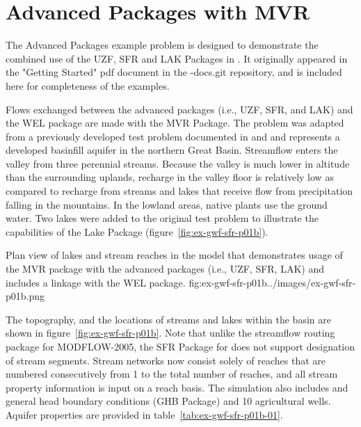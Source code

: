 \section{Advanced Packages with MVR}

The Advanced \mf Packages example problem is designed to demonstrate the combined use of the UZF, SFR and LAK Packages in \mf.  It originally appeared in the "Getting Started" pdf document in the \mf -docs.git repository, and is included here for completeness of the examples. 

Flows exchanged between the advanced packages (i.e., UZF, SFR, and LAK) and the WEL package are made with the MVR Package. The problem was adapted from a previously developed test problem documented in \cite{modflowsfr1pack} and \cite{modflowsfr2pack} and represents a developed basinfill aquifer in the northern Great Basin. Streamflow enters the valley from three perennial streams. Because the valley is much lower in altitude than the surrounding uplands, recharge in the valley floor is relatively low as compared to recharge from streams and lakes that receive flow from precipitation falling in the mountains. In the lowland areas, native plants use the ground water. Two lakes were added to the original test problem to illustrate the capabilities of the Lake Package (figure~\ref{fig:ex-gwf-sfr-p01b}).

\begin{StandardFigure}
	{Plan view of lakes and stream reaches in the \mf model that demonstrates usage of the MVR package with the advanced packages (i.e., UZF, SFR, LAK) and includes a linkage with the WEL package.}
	{fig:ex-gwf-sfr-p01b}{../images/ex-gwf-sfr-p01b.png}
\end{StandardFigure}

The topography, and the locations of streams and lakes within the basin are shown in figure~\ref{fig:ex-gwf-sfr-p01b}. Note that unlike the streamflow routing package for MODFLOW-2005, the SFR Package for \mf does not support designation of stream segments. Stream networks now consist solely of reaches that are numbered consecutively from 1 to the total number of reaches, and all stream property information is input on a reach basis. The simulation also includes and general head boundary conditions (GHB Package) and 10 agricultural wells. Aquifer properties are provided in table~\ref{tab:ex-gwf-sfr-p01b-01}.



